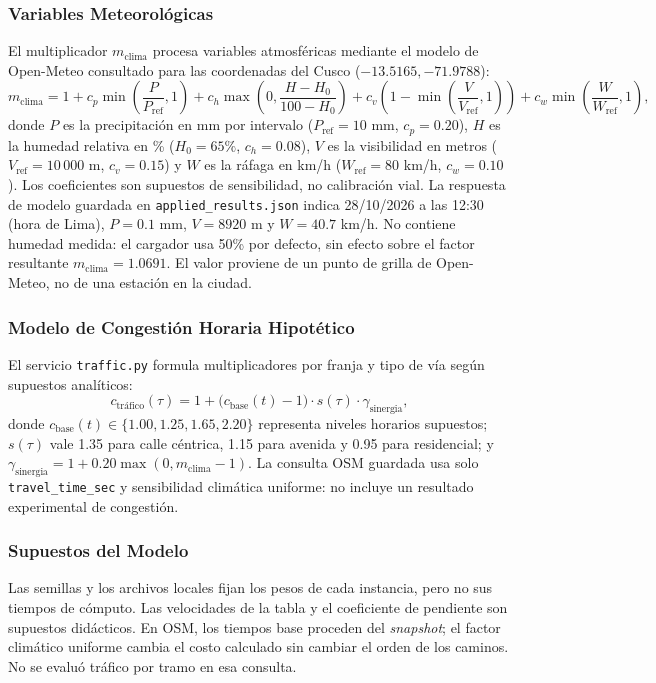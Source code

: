 \subsubsection{Variables Meteorológicas}
El multiplicador $m_{\text{clima}}$ procesa variables atmosféricas mediante el modelo de Open-Meteo consultado para las coordenadas del Cusco ($-13.5165, -71.9788$):
\begin{equation}
    m_{\text{clima}} = 1 + c_p \min\left(\frac{P}{P_{\text{ref}}}, 1\right) + c_h \max\left(0, \frac{H - H_0}{100 - H_0}\right) + c_v \left(1 - \min\left(\frac{V}{V_{\text{ref}}}, 1\right)\right) + c_w \min\left(\frac{W}{W_{\text{ref}}}, 1\right),
    \label{eq:clima_integral}
\end{equation}
donde $P$ es la precipitación en mm por intervalo ($P_{\text{ref}}=10$ mm, $c_p=0.20$), $H$ es la humedad relativa en \% ($H_0=65\%$, $c_h=0.08$), $V$ es la visibilidad en metros ($V_{\text{ref}}=10\,000$ m, $c_v=0.15$) y $W$ es la ráfaga en km/h ($W_{\text{ref}}=80$ km/h, $c_w=0.10$). Los coeficientes son supuestos de sensibilidad, no calibración vial. La respuesta de modelo guardada en \texttt{applied\_results.json} indica 28/10/2026 a las 12:30 (hora de Lima), $P=0.1$ mm, $V=8920$ m y $W=40.7$ km/h. No contiene humedad medida: el cargador usa 50\% por defecto, sin efecto sobre el factor resultante $m_{\text{clima}}=1.0691$. El valor proviene de un punto de grilla de Open-Meteo, no de una estación en la ciudad.

\subsubsection{Modelo de Congestión Horaria Hipotético}
El servicio \texttt{traffic.py} formula multiplicadores por franja y tipo de vía según supuestos analíticos:
\begin{equation}
    c_{\text{tráfico}}(\tau) = 1 + \bigl(c_{\text{base}}(t) - 1\bigr) \cdot s(\tau) \cdot \gamma_{\text{sinergia}},
    \label{eq:trafico}
\end{equation}
donde $c_{\text{base}}(t) \in \{1.00, 1.25, 1.65, 2.20\}$ representa niveles horarios supuestos; $s(\tau)$ vale 1.35 para calle céntrica, 1.15 para avenida y 0.95 para residencial; y $\gamma_{\text{sinergia}}=1+0.20\max(0,m_{\text{clima}}-1)$. La consulta OSM guardada usa solo \texttt{travel\_time\_sec} y sensibilidad climática uniforme: no incluye un resultado experimental de congestión.

\subsubsection{Supuestos del Modelo}
Las semillas y los archivos locales fijan los pesos de cada instancia, pero no sus tiempos de cómputo. Las velocidades de la tabla y el coeficiente de pendiente son supuestos didácticos. En OSM, los tiempos base proceden del \textit{snapshot}; el factor climático uniforme cambia el costo calculado sin cambiar el orden de los caminos. No se evaluó tráfico por tramo en esa consulta.

